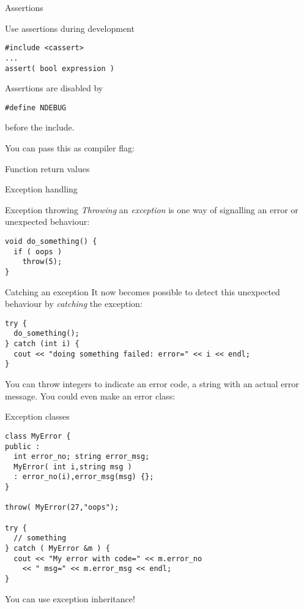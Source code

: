  {Assertions}

\begin{block}{Use assertions during development}
  \label{sl:cpp-assert}
\begin{lstlisting}
#include <cassert>
...
assert( bool expression )
\end{lstlisting}
Assertions are disabled by
\begin{lstlisting}
#define NDEBUG
\end{lstlisting}
before the include.

You can pass this as compiler flag:\\
\end{block}

Function return values

 {Exception handling}

\begin{block}{Exception throwing}
  \label{sl:exception-throw}
  \emph{Throwing} an \emph{exception}%
   is one way of signalling an error or
  unexpected behaviour:
\begin{lstlisting}
void do_something() {
  if ( oops )
    throw(5);
}
\end{lstlisting}
\end{block}

\begin{block}{Catching an exception}
  \label{sl:exception-catch}
  It now becomes possible to detect this unexpected behaviour by
  \emph{catching}
  the exception:
\begin{lstlisting}
try {
  do_something();
} catch (int i) {
  cout << "doing something failed: error=" << i << endl;
}
\end{lstlisting}
\end{block}

You can throw integers to indicate an error code, a string with an
actual error message. You could even make an error class:

\begin{block}{Exception classes}
  \label{sl:exception-class}
\begin{lstlisting}
class MyError {
public :
  int error_no; string error_msg;
  MyError( int i,string msg )
  : error_no(i),error_msg(msg) {};
}

throw( MyError(27,"oops");

try {
  // something
} catch ( MyError &m ) {
  cout << "My error with code=" << m.error_no
    << " msg=" << m.error_msg << endl;
}
\end{lstlisting}
You can use exception inheritance!
\end{block}


